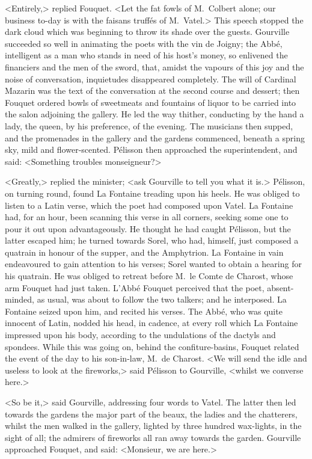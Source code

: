 <Entirely,> replied Fouquet. <Let the fat fowls of M.~Colbert alone; our business to-day is with the faisans truffés of M.~Vatel.> This speech stopped the dark cloud which was beginning to throw its shade over the guests. Gourville succeeded so well in animating the poets with the vin de Joigny; the Abbé, intelligent as a man who stands in need of his host's money, so enlivened the financiers and the men of the sword, that, amidst the vapours of this joy and the noise of conversation, inquietudes disappeared completely. The will of Cardinal Mazarin was the text of the conversation at the second course and dessert; then Fouquet ordered bowls of sweetmeats and fountains of liquor to be carried into the salon adjoining the gallery. He led the way thither, conducting by the hand a lady, the queen, by his preference, of the evening. The musicians then supped, and the promenades in the gallery and the gardens commenced, beneath a spring sky, mild and flower-scented. Pélisson then approached the superintendent, and said: <Something troubles monseigneur?>

<Greatly,> replied the minister; <ask Gourville to tell you what it is.> Pélisson, on turning round, found La Fontaine treading upon his heels. He was obliged to listen to a Latin verse, which the poet had composed upon Vatel. La Fontaine had, for an hour, been scanning this verse in all corners, seeking some one to pour it out upon advantageously. He thought he had caught Pélisson, but the latter escaped him; he turned towards Sorel, who had, himself, just composed a quatrain in honour of the supper, and the Amphytrion. La Fontaine in vain endeavoured to gain attention to his verses; Sorel wanted to obtain a hearing for his quatrain. He was obliged to retreat before M.~le Comte de Charost, whose arm Fouquet had just taken. L'Abbé Fouquet perceived that the poet, absent-minded, as usual, was about to follow the two talkers; and he interposed. La Fontaine seized upon him, and recited his verses. The Abbé, who was quite innocent of Latin, nodded his head, in cadence, at every roll which La Fontaine impressed upon his body, according to the undulations of the dactyls and spondees. While this was going on, behind the confiture-basins, Fouquet related the event of the day to his son-in-law, M.~de Charost. <We will send the idle and useless to look at the fireworks,> said Pélisson to Gourville, <whilst we converse here.>

<So be it,> said Gourville, addressing four words to Vatel. The latter then led towards the gardens the major part of the beaux, the ladies and the chatterers, whilst the men walked in the gallery, lighted by three hundred wax-lights, in the sight of all; the admirers of fireworks all ran away towards the garden. Gourville approached Fouquet, and said: <Monsieur, we are here.>

